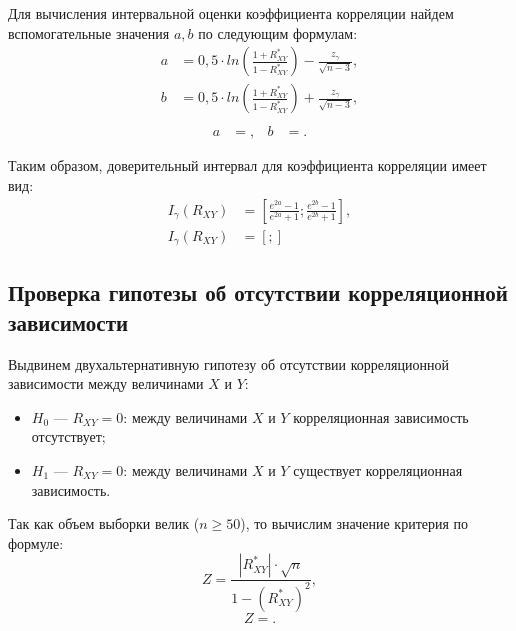 \documentclass[14pt,hidelinks]{extarticle}
\begin{document}
Для вычисления интервальной оценки коэффициента корреляции найдем вспомогательные значения $a, b$ по следующим формулам:
\begin{equation}
  \begin{aligned}
    a &= 0,5 \cdot ln \left( \frac{1+R^*_{XY}}{1-R^*_{XY}} \right) - \frac{z_{\gamma}}{\sqrt{n-3}}, \\
    b &= 0,5 \cdot ln \left( \frac{1+R^*_{XY}}{1-R^*_{XY}} \right) + \frac{z_{\gamma}}{\sqrt{n-3}}, \\
  \end{aligned}
\end{equation}
\begin{equation*}
  \begin{aligned}
    a &= , &
    b &= .
  \end{aligned}
\end{equation*}

Таким образом, доверительный интервал для коэффициента корреляции имеет вид:
\begin{align}
  I_{\gamma} (R_{XY}) &= \left[ \frac{e^{2a}-1}{e^{2a}+1}; \frac{e^{2b}-1}{e^{2b}+1} \right], \\ \nonumber
  I_{\gamma} (R_{XY}) &= \left[ ; 
     \right]
\end{align}

\newpage 

\subsection{Проверка гипотезы об отсутствии корреляционной зависимости}
Выдвинем двухальтернативную гипотезу об отсутствии корреляционной зависимости 
между величинами $ X $ и $ Y $:

\begin{itemize}
\item $H_0$ --- $ R_{XY} = 0 $: между величинами $ X $ и $ Y $ корреляционная зависимость отсутствует;
\item $H_1$ --- $ R_{XY} = 0 $: между величинами $ X $ и $ Y $ существует корреляционная зависимость.
\end{itemize}

Так как объем выборки велик ($ n \ge 50 $), то вычислим значение критерия по формуле:
\begin{equation}
  Z = \dfrac{|R^*_{XY}| \cdot \sqrt{n}}{1-(R^*_{XY})^2},
\end{equation}
\begin{equation*}
  Z = .
\end{equation*}
\end{document}
